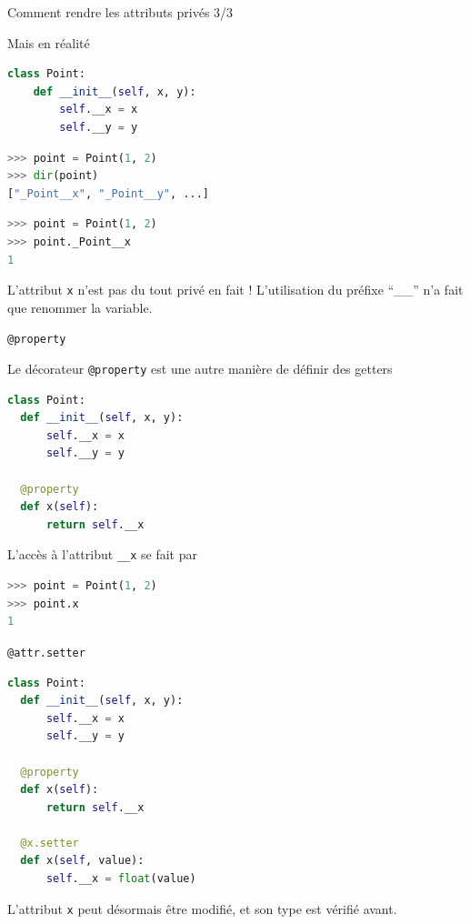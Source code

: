 \documentclass[10pt]{beamer}
\begin{document}
\begin{frame}[fragile]{Comment rendre les attributs privés 3/3}

  Mais en réalité
  \begin{lstlisting}[language=Python, numbers=none]
class Point:
    def __init__(self, x, y):
        self.__x = x
        self.__y = y
\end{lstlisting}

  \begin{overprint}

\begin{lstlisting}[language=Python, numbers=none]
>>> point = Point(1, 2)
>>> dir(point)
["_Point__x", "_Point__y", ...]
\end{lstlisting}

\begin{lstlisting}[language=Python, numbers=none]
>>> point = Point(1, 2)
>>> point._Point__x
1
\end{lstlisting}
  L'attribut \texttt{x} n'est pas du tout privé en fait !
  L'utilisation du préfixe ``\_\_'' n'a fait que renommer la variable.
  \end{overprint}

  \end{frame}



\begin{frame}[fragile]{\texttt{@property}}

  Le décorateur \texttt{@property} est une autre manière de définir des getters
  
\begin{lstlisting}[language=Python, numbers=none]
class Point:
  def __init__(self, x, y):
      self.__x = x
      self.__y = y

  @property
  def x(self):
      return self.__x
\end{lstlisting}

L'accès à l'attribut \texttt{\_\_x} se fait par 

\begin{lstlisting}[language=Python, numbers=none]
>>> point = Point(1, 2)
>>> point.x
1
\end{lstlisting}
\end{frame}

\begin{frame}[fragile]{\texttt{@attr.setter}}
\begin{lstlisting}[language=Python, numbers=none]
class Point:
  def __init__(self, x, y):
      self.__x = x
      self.__y = y

  @property
  def x(self):
      return self.__x
  
  @x.setter
  def x(self, value):
      self.__x = float(value)

\end{lstlisting}

L'attribut \texttt{x} peut désormais être modifié, et son type est vérifié avant. 

\end{frame}
\end{document}
